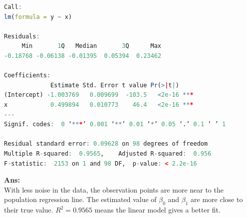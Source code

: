 \documentclass[twoside]{homework}
\begin{document}
\begin{lstlisting}[language=R]
Call:
lm(formula = y ~ x)

Residuals:
     Min       1Q   Median       3Q      Max 
-0.18768 -0.06138 -0.01395  0.05394  0.23462 

Coefficients:
             Estimate Std. Error t value Pr(>|t|)    
(Intercept) -1.003769   0.009699  -103.5   <2e-16 ***
x            0.499894   0.010773    46.4   <2e-16 ***
---
Signif. codes:  0 ‘***’ 0.001 ‘**’ 0.01 ‘*’ 0.05 ‘.’ 0.1 ‘ ’ 1

Residual standard error: 0.09628 on 98 degrees of freedom
Multiple R-squared:  0.9565,	Adjusted R-squared:  0.956 
F-statistic:  2153 on 1 and 98 DF,  p-value: < 2.2e-16
\end{lstlisting}
\textbf{Ans:}\\
With less noise in the data, the observation points are more near to the population regression line. The estimated value of $\beta_0$ and $\beta_1$ are more close to their true value. $R^2 = 0.9565$ means the linear model gives a better fit. 
\end{document}
